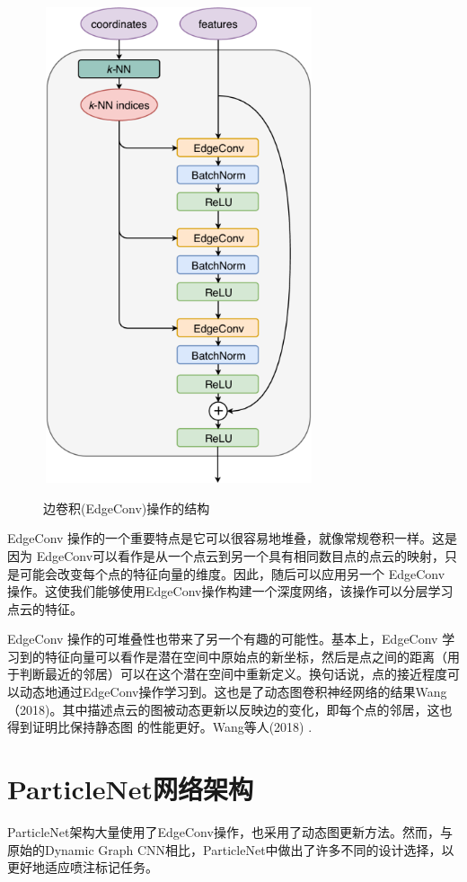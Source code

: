 \begin{figure}[H]
 \centering
 \caption{边卷积(EdgeConv)操作的结构}
 \includegraphics[height=14cm, width=8cm]{pictures/edgeconv.png}
 \label{fig:4.1}
\end{figure}

EdgeConv 操作的一个重要特点是它可以很容易地堆叠，就像常规卷积一样。这是因为 EdgeConv可以看作是从一个点云到另一个具有相同数目点的点云的映射，只是可能会改变每个点的特征向量的维度。因此，随后可以应用另一个 EdgeConv 操作。这使我们能够使用EdgeConv操作构建一个深度网络，该操作可以分层学习点云的特征。

EdgeConv 操作的可堆叠性也带来了另一个有趣的可能性。基本上，EdgeConv 学习到的特征向量可以看作是潜在空间中原始点的新坐标，然后是点之间的距离（用于判断最近的邻居）可以在这个潜在空间中重新定义。换句话说，点的接近程度可以动态地通过EdgeConv操作学习到。这也是了动态图卷积神经网络的结果Wang（2018)。其中描述点云的图被动态更新以反映边的变化，即每个点的邻居，这也得到证明比保持静态图 的性能更好。Wang等人(2018) .

\section{ParticleNet网络架构}
ParticleNet架构大量使用了EdgeConv操作，也采用了动态图更新方法。然而，与原始的Dynamic Graph CNN相比，ParticleNet中做出了许多不同的设计选择，以更好地适应喷注标记任务。

